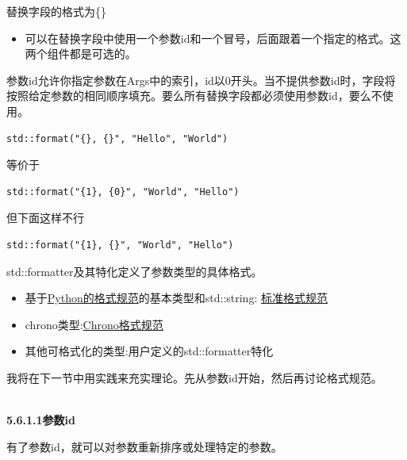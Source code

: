 替换字段的格式为\{\}

\begin{itemize}
\item 
可以在替换字段中使用一个参数id和一个冒号，后面跟着一个指定的格式。这两个组件都是可选的。
\end{itemize}

参数id允许你指定参数在Args中的索引，id以0开头。当不提供参数id时，字段将按照给定参数的相同顺序填充。要么所有替换字段都必须使用参数id，要么不使用。

\begin{lstlisting}[style=styleCXX]
std::format("{}, {}", "Hello", "World") 
\end{lstlisting}

等价于

\begin{lstlisting}[style=styleCXX]
std::format("{1}, {0}", "World", "Hello")
\end{lstlisting}

但下面这样不行

\begin{lstlisting}[style=styleCXX]
std::format("{1}, {}", "World", "Hello") 
\end{lstlisting}

std::formatter及其特化定义了参数类型的具体格式。

\begin{itemize}
\item 
基于\href{ttps://docs.python.org/3/library/stdtypes.html#str.format}{Python的格式规范}的基本类型和std::string: \href{https://en.cppreference.com/w/cpp/utility/format/formatter#Standard_format_specification}{标准格式规范}

\item 
chrono类型:\href{ttps://en.cppreference.com/w/cpp/chrono/system_clock/formatter#Format_specification}{Chrono格式规范}

\item 
其他可格式化的类型:用户定义的std::formatter特化
\end{itemize}

我将在下一节中用实践来充实理论。先从参数id开始，然后再讨论格式规范。

\hspace*{\fill} \\ %
\noindent
\textbf{5.6.1.1\hspace{0.2cm}参数id}

有了参数id，就可以对参数重新排序或处理特定的参数。

